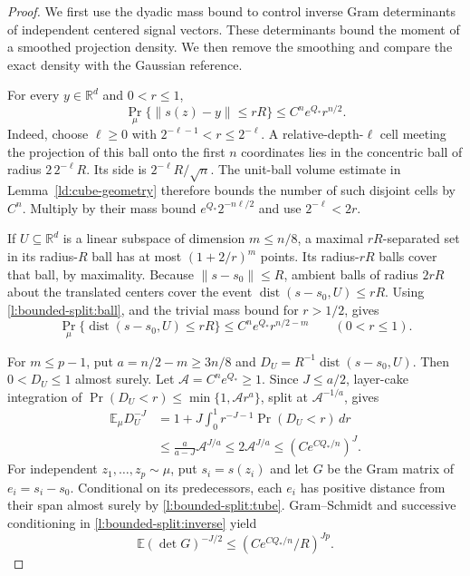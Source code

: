 \begin{proof}
We first use the dyadic mass bound to control inverse Gram determinants
of independent centered signal vectors.  These determinants bound the
moment of a smoothed projection density.  We then remove the smoothing
and compare the exact density with the Gaussian reference.

For every \(y\in\mathbb R^d\) and \(0<r\le1\),
\begin{equation}\label{l:bounded-split:ball}
 \Pr_\mu\{\|s(z)-y\|\le rR\}\le C^ne^{Q_*}r^{n/2}.
\end{equation}
Indeed, choose \(\ell\ge0\) with
\(2^{-\ell-1}<r\le2^{-\ell}\).  A relative-depth-\(\ell\)
cell meeting the projection of this ball onto the first \(n\)
coordinates lies in the concentric ball of radius
\(2\,2^{-\ell}R\).  Its side is \(2^{-\ell}R/\sqrt n\).
The unit-ball volume estimate in Lemma~\ref{ld:cube-geometry}
therefore bounds the number of such disjoint cells by \(C^n\).
Multiply by their mass bound \(e^{Q_*}2^{-n\ell/2}\) and use
\(2^{-\ell}<2r\).

If \(U\subseteq\mathbb R^d\) is a linear subspace of dimension
\(m\le n/8\), a maximal \(rR\)-separated set in its radius-\(R\)
ball has at most \((1+2/r)^m\) points.  Its radius-\(rR\)
balls cover that ball, by maximality.  Because \(\|s-s_0\|\le R\),
ambient balls of radius \(2rR\) about the translated centers cover
the event \(\operatorname{dist}(s-s_0,U)\le rR\).
Using \eqref{l:bounded-split:ball}, and the trivial mass bound for
\(r>1/2\), gives
\begin{equation}\label{l:bounded-split:tube}
 \Pr_\mu\{\operatorname{dist}(s-s_0,U)\le rR\}
 \le C^ne^{Q_*}r^{n/2-m}\qquad(0<r\le1).
\end{equation}

For \(m\le p-1\), put \(a=n/2-m\ge3n/8\) and
\(D_U=R^{-1}\operatorname{dist}(s-s_0,U)\).
Then \(0<D_U\le1\) almost surely.  Let
\(\mathcal A=C^ne^{Q_*}\ge1\).  Since \(J\le a/2\), layer-cake
integration of \(\Pr(D_U<r)\le\min\{1,\mathcal A r^a\}\), split at
\(\mathcal A^{-1/a}\), gives
\begin{equation}\label{l:bounded-split:inverse}
 \begin{split}
 \mathbb E_\mu D_U^{-J}
 &=1+J\int_0^1r^{-J-1}\Pr(D_U<r)\,dr\\
 &\le\frac a{a-J}\mathcal A^{J/a}
 \le2\mathcal A^{J/a}\le(Ce^{CQ_*/n})^J.
 \end{split}
\end{equation}
For independent \(z_1,\ldots,z_p\sim\mu\), put \(s_i=s(z_i)\)
and let \(G\) be the Gram matrix of \(e_i=s_i-s_0\).  Conditional on its
predecessors, each \(e_i\) has positive distance from their span
almost surely by \eqref{l:bounded-split:tube}.  Gram--Schmidt and
successive conditioning in \eqref{l:bounded-split:inverse} yield
\begin{equation}\label{l:bounded-split:gram}
 \mathbb E(\det G)^{-J/2}
 \le(Ce^{CQ_*/n}/R)^{Jp}.
\end{equation}


\end{proof}
